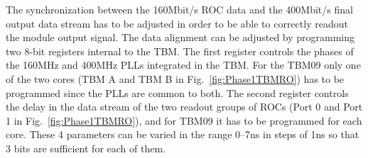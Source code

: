 The synchronization between the 160\unit{Mbit/s} ROC data and the 400\unit{Mbit/s} final output data stream has to be adjusted in order to be able to correctly readout the module output signal.
The data alignment can be adjusted by programming two 8-bit registers internal to the TBM.
The first register controls the phases of the 160\unit{MHz} and 400\unit{MHz} PLLs integrated in the TBM.
For the TBM09 only one of the two cores (TBM A and TBM B in Fig.~\ref{fig:Phase1TBMRO}) has to be programmed since the PLLs are common to both.
The second register controls the delay in the data stream of the two readout groups of ROCs (Port 0 and Port 1 in Fig.~\ref{fig:Phase1TBMRO}), and for TBM09 it has to be programmed for each core.
These 4 parameters can be varied in the range 0--7\unit{ns} in steps of 1\unit{ns} so that 3 bits are sufficient for each of them.


